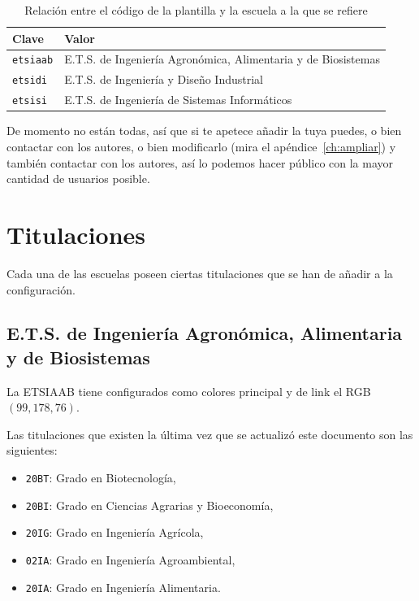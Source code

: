 \documentclass[%
    school=etsisi,%
    type=pfg,%
    degree=61CI,%
]{upm-report}
\begin{document}
\begin{table}
    \centering
    \begin{tabularx}{\textwidth}{@{}lX@{}}
        \toprule
        \textbf{Clave}   & \textbf{Valor} \\
        \midrule
        \texttt{etsiaab} & E.T.S. de Ingeniería Agronómica, Alimentaria y de Biosistemas \\
        \texttt{etsidi}  & E.T.S. de Ingeniería y Diseño Industrial \\
        \texttt{etsisi}  & E.T.S. de Ingeniería de Sistemas Informáticos \\
        \bottomrule
    \end{tabularx}
    \caption{\label{tbl:schools} Relación entre el código de la plantilla y la escuela a la que se refiere}
\end{table}

De momento no están todas, así que si te apetece añadir la tuya puedes, o bien contactar con los autores, o bien modificarlo (mira el apéndice~\ref{ch:ampliar}) y también contactar con los autores, así lo podemos hacer público con la mayor cantidad de usuarios posible.

\section{Titulaciones}

Cada una de las escuelas poseen ciertas titulaciones que se han de añadir a la configuración.

\subsection{E.T.S. de Ingeniería Agronómica, Alimentaria y de Biosistemas}

La ETSIAAB tiene configurados como colores principal y de link el RGB $(99,178,76)$.

Las titulaciones que existen la última vez que se actualizó este documento son las siguientes:

\begin{itemize}
    \item \texttt{20BT}: Grado en Biotecnología,
    \item \texttt{20BI}: Grado en Ciencias Agrarias y Bioeconomía,
    \item \texttt{20IG}: Grado en Ingeniería Agrícola,
    \item \texttt{02IA}: Grado en Ingeniería Agroambiental,
    \item \texttt{20IA}: Grado en Ingeniería Alimentaria.
\end{itemize}
\end{document}
